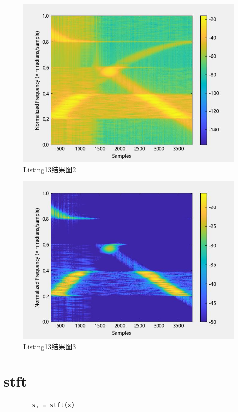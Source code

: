 \documentclass{article}
\begin{document}
	\begin{figure}[htbp]
		\centering
		\includegraphics{hw5(13)-2.jpeg}
		\caption{Listing13结果图2}
		\label{fig13-2}
	\end{figure}
	\begin{figure}[htbp]
		\centering
		\includegraphics{hw5(13)-3.jpeg}
		\caption{Listing13结果图3}
		\label{fig13-3}
	\end{figure}
	
	\section*{stft}
	
	\begin{verbatim}
		s, = stft(x)
	\end{verbatim}
	
\end{document}

